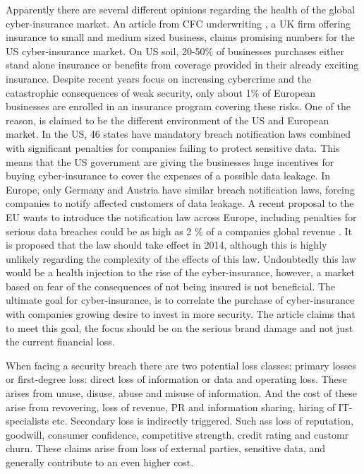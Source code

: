 Apparently there are several different opinions regarding the health of the global cyber-insurance market. An article from CFC underwriting \cite{CFCunder}, a UK firm offering insurance to small and medium sized business, claims promising numbers for the US cyber-insurance market. On US soil, 20-50$\%$ of businesses purchases either stand alone insurance or benefits from coverage provided in their already exciting insurance. Despite recent years focus on increasing cybercrime and the catastrophic consequences of weak security, only about 1$\%$ of European businesses are enrolled in an insurance program covering these risks. 
One of the reason, is claimed to be the different environment of the US and European market. In the US, 46 states have mandatory breach notification laws combined with significant penalties for companies failing to protect sensitive data. This means that the US government are giving the businesses huge incentives for buying cyber-insurance to cover the expenses of a possible data leakage. In Europe, only Germany and Austria have similar breach notification laws, forcing companies to notify affected customers of data leakage. A recent proposal to the EU wants to introduce the notification law across Europe, including penalties for serious data breaches could be as high as 2 $\%$ of a companies global revenue \cite{CFCunder}. It is proposed that the law should take effect in 2014, although this is highly unlikely regarding the complexity of the effects of this law. Undoubtedly this law would be a health injection to the rise of the cyber-insurance, however, a market based on fear of the consequences of not being insured is not beneficial. The ultimate goal for cyber-insurance, is to correlate the purchase of cyber-insurance with companies growing desire to invest in more security. 
The article claims that to meet this goal, the focus should be on the serious brand damage and not just the current financial loss. \cite{CFCunder}



When facing a security breach there are two potential loss classes:
primary losses or first-degree loss: direct loss of information or data and operating loss. 
These arises from unuse, disuse, abuse and misuse of information.
 And the cost of these arise from revovering, loss of revenue, 
 PR and information sharing, hiring of IT-specialists etc. 
Secondary loss is indirectly triggered. Such ass loss of reputation, goodwill, 
consumer confidence, competitive strength, credit rating and customr churn. 
These claims arise from loss of external parties, sensitive data, 
and generally contribute to an even higher cost. \cite{bandyopadhyay2009managers} 

